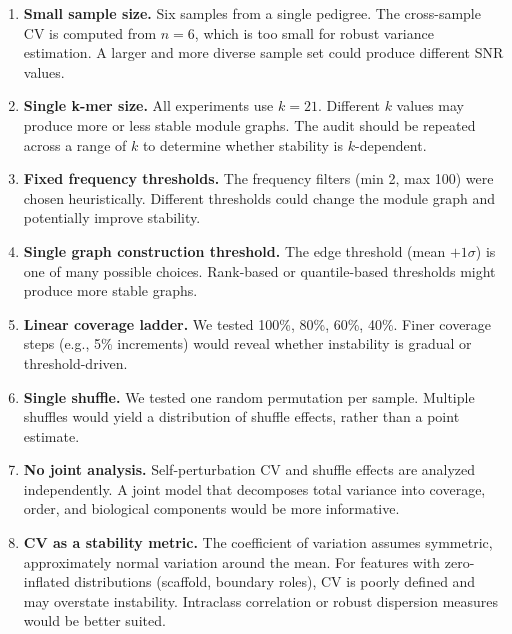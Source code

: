 \documentclass{../yalumba}
\begin{document}
\begin{enumerate}
  \item \textbf{Small sample size.}  Six samples from a single pedigree.
    The cross-sample CV is computed from $n = 6$, which is too small for
    robust variance estimation.  A larger and more diverse sample set
    could produce different SNR values.

  \item \textbf{Single k-mer size.}  All experiments use $k = 21$.
    Different $k$ values may produce more or less stable module graphs.
    The audit should be repeated across a range of $k$ to determine
    whether stability is $k$-dependent.

  \item \textbf{Fixed frequency thresholds.}  The frequency filters
    (min 2, max 100) were chosen heuristically.  Different thresholds
    could change the module graph and potentially improve stability.

  \item \textbf{Single graph construction threshold.}  The edge
    threshold (mean $+ 1\sigma$) is one of many possible choices.
    Rank-based or quantile-based thresholds might produce more stable
    graphs.

  \item \textbf{Linear coverage ladder.}  We tested 100\%, 80\%, 60\%,
    40\%.  Finer coverage steps (e.g., 5\% increments) would reveal
    whether instability is gradual or threshold-driven.

  \item \textbf{Single shuffle.}  We tested one random permutation
    per sample.  Multiple shuffles would yield a distribution of
    shuffle effects, rather than a point estimate.

  \item \textbf{No joint analysis.}  Self-perturbation CV and shuffle
    effects are analyzed independently.  A joint model that
    decomposes total variance into coverage, order, and biological
    components would be more informative.

  \item \textbf{CV as a stability metric.}  The coefficient of
    variation assumes symmetric, approximately normal variation around
    the mean.  For features with zero-inflated distributions (scaffold,
    boundary roles), CV is poorly defined and may overstate instability.
    Intraclass correlation or robust dispersion measures would be
    better suited.


\end{enumerate}
\end{document}
